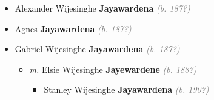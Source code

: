 \documentclass[10pt, openany]{book}
\begin{document}
\begin{itemize}
{\begin{itemize}
{\begin{itemize}
{\begin{itemize}
\item{Herbert  \textbf{Perera} \textcolor{gray}{\textit{(b. 191?)}}
 }
\item{Letitia  \textbf{Perera} \textcolor{gray}{\textit{(b. 191?)}}
 }
\item{Edith  \textbf{Perera} \textcolor{gray}{\textit{(b. 191?)}}
 }
\end{itemize}}
\end{itemize}
 }
\item{Alexander Wijesinghe \textbf{Jayawardena} \textcolor{gray}{\textit{(b. 187?)}}
  }
\item{Agnes \textbf{Jayawardena} \textcolor{gray}{\textit{(b. 187?)}}
 }
\item{Gabriel Wijesinghe \textbf{Jayawardena} \textcolor{gray}{\textit{(b. 187?)}}
\begin{itemize}
\item{\textit{m.} Elsie Wijesinghe \textbf{Jayewardene} \textcolor{gray}{\textit{(b. 188?)}}   \label{couple:00003208:00003209} \begin{itemize}
\item{Stanley Wijesinghe \textbf{Jayawardena} \textcolor{gray}{\textit{(b. 190?)}}
  }
\end{itemize}}
\end{itemize}
  }
\end{itemize}}
\end{itemize}
   
\end{document}
